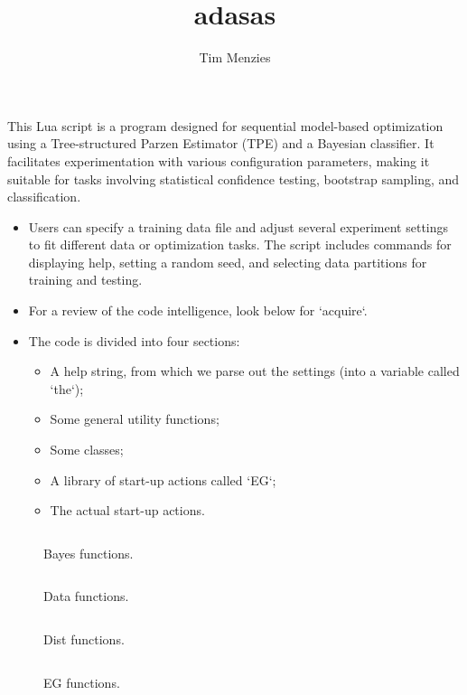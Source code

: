 \documentclass[10pt,twocolumn,landscape]{book}
\title{adasas}
\author{Tim Menzies}
\begin{document}
\maketitle
\small

 This Lua script is a program designed for sequential
   model-based optimization using a Tree-structured Parzen Estimator
   (TPE) and a Bayesian classifier. It facilitates experimentation
   with various configuration parameters, making it suitable for tasks
   involving statistical confidence testing, bootstrap sampling, and
   classification.
   \begin{itemize}
   \item
  Users can specify a training data file and adjust several experiment
   settings to fit different data or optimization tasks. The script
   includes commands for displaying help, setting a random seed, and
   selecting data partitions for training and testing. 
   \item
  For a review of the code intelligence, look below for `acquire`.
  \item
  The code is divided into four sections:
   \begin{itemize}
   \item
      A help string, from which we parse out the settings (into a variable called `the`);
     \item Some general utility functions;
     \item Some classes;
     \item A library of start-up actions called `EG`;
     \item The actual start-up actions.
   \end{itemize}
   \end{itemize}

\begin{figure}[!t]
\caption{Bayes functions.}\label{bayes}
\inputminted{lua}{luas/Bayes.lua}
\end{figure}

\begin{figure}[!t]
\caption{Data functions.}\label{data}
\inputminted{lua}{luas/Data.lua}
\end{figure}

\begin{figure}[!t]
\caption{Dist functions.}\label{dist}
\inputminted{lua}{luas/Dist.lua}
\end{figure}

\begin{figure}[!t]
\caption{EG functions.}\label{eg}
\inputminted{lua}{luas/EG.lua}
\end{figure}
\end{document}
